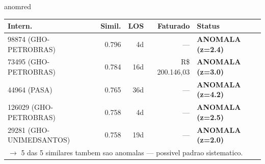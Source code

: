 \documentclass[a4paper,10pt]{article}
\begin{document}
\begin{anomalycard}[Internacao 162889 | GHO-PETROBRAS | CRITICO (z=5.17)]{anomred}
\begin{tabular}{l r r r l}\toprule\textbf{Intern.} & \textbf{Simil.} & \textbf{LOS} & \textbf{Faturado} & \textbf{Status} \\\midrule
98874 (GHO-PETROBRAS) & 0.796 & 4d & --- & \textcolor{anomred}{\textbf{ANOMALA (z=2.4)}} \\
73495 (GHO-PETROBRAS) & 0.784 & 16d & R\$ 200.146,03 & \textcolor{anomred}{\textbf{ANOMALA (z=3.0)}} \\
44964 (PASA) & 0.765 & 36d & --- & \textcolor{anomred}{\textbf{ANOMALA (z=4.2)}} \\
126029 (GHO-PETROBRAS) & 0.758 & 4d & --- & \textcolor{anomred}{\textbf{ANOMALA (z=2.5)}} \\
29281 (GHO-UNIMEDSANTOS) & 0.758 & 19d & --- & \textcolor{anomred}{\textbf{ANOMALA (z=2.0)}} \\
\multicolumn{5}{l}{\textcolor{anomred}{\small $\rightarrow$ 5 das 5 similares tambem sao anomalas --- possivel padrao sistematico.}} \\
\bottomrule\end{tabular}


\end{anomalycard}

\newpage
\end{document}
